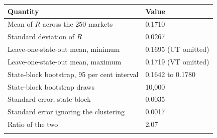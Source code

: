 \setlength{\tabcolsep}{4pt}
\begin{tabular}{@{}ll@{}}
\toprule
Quantity & Value\\
\midrule
Mean of $R$ across the 250 markets & 0.1710\\
Standard deviation of $R$ & 0.0267\\
Leave-one-state-out mean, minimum & 0.1695 (UT omitted)\\
Leave-one-state-out mean, maximum & 0.1719 (VT omitted)\\
State-block bootstrap, 95 per cent interval & 0.1642 to 0.1780\\
State-block bootstrap draws & 10,000\\
Standard error, state-block & 0.0035\\
Standard error ignoring the clustering & 0.0017\\
Ratio of the two & 2.07\\
\botrule
\end{tabular}
